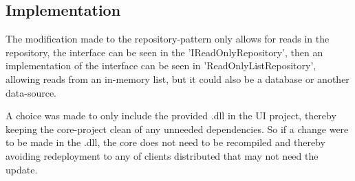 \subsection{Implementation}

The modification made to the repository-pattern only allows for reads in the repository, the interface can be seen in the 'IReadOnlyRepository', then an implementation of the interface can be seen in 'ReadOnlyListRepository', allowing reads from an in-memory list, but it could also be a database or another data-source.

A choice was made to only include the provided .dll in the UI project, thereby keeping the core-project clean of any unneeded dependencies. So if a change were to be made in the .dll, the core does not need to be recompiled and thereby avoiding redeployment to any of clients distributed that may not need the update. 

